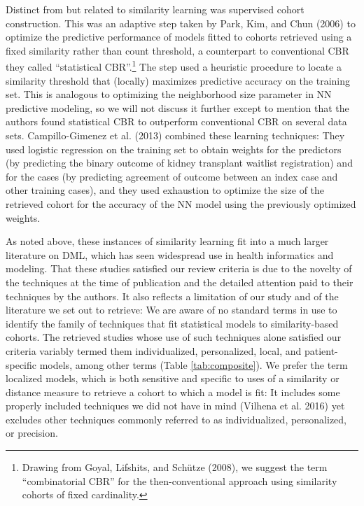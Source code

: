 \documentclass{article}
\begin{document}
Distinct from but related to similarity learning was supervised cohort
construction. This was an adaptive step taken by Park, Kim, and Chun
(2006) to optimize the predictive performance of models fitted to
cohorts retrieved using a fixed similarity rather than count threshold,
a counterpart to conventional CBR they called ``statistical
CBR''.\footnote{Drawing from Goyal, Lifshits, and Schütze (2008), we
  suggest the term ``combinatorial CBR'' for the then-conventional
  approach using similarity cohorts of fixed cardinality.} The step used
a heuristic procedure to locate a similarity threshold that (locally)
maximizes predictive accuracy on the training set. This is analogous to
optimizing the neighborhood size parameter in NN predictive modeling, so
we will not discuss it further except to mention that the authors found
statistical CBR to outperform conventional CBR on several data sets.
Campillo-Gimenez et al. (2013) combined these learning techniques: They
used logistic regression on the training set to obtain weights for the
predictors (by predicting the binary outcome of kidney transplant
waitlist registration) and for the cases (by predicting agreement of
outcome between an index case and other training cases), and they used
exhaustion to optimize the size of the retrieved cohort for the accuracy
of the NN model using the previously optimized weights.

As noted above, these instances of similarity learning fit into a much
larger literature on DML, which has seen widespread use in health
informatics and modeling. That these studies satisfied our review
criteria is due to the novelty of the techniques at the time of
publication and the detailed attention paid to their techniques by the
authors. It also reflects a limitation of our study and of the
literature we set out to retrieve: We are aware of no standard terms in
use to identify the family of techniques that fit statistical models to
similarity-based cohorts. The retrieved studies whose use of such
techniques alone satisfied our criteria variably termed them
individualized, personalized, local, and patient-specific models, among
other terms (Table \ref{tab:composite}). We prefer the term localized
models, which is both sensitive and specific to uses of a similarity or
distance measure to retrieve a cohort to which a model is fit: It
includes some properly included techniques we did not have in mind
(Vilhena et al. 2016) yet excludes other techniques commonly referred to
as individualized, personalized, or precision.
\end{document}
